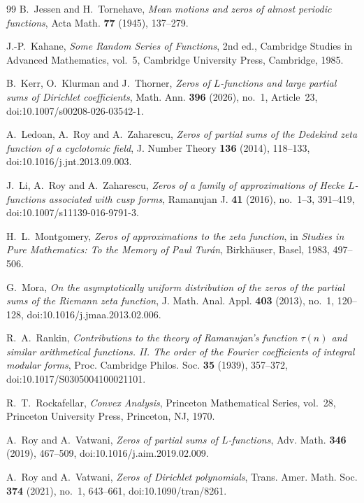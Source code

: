 \documentclass[11pt]{article}
\theoremstyle{definition}
\newcommand{\1}{\mathbf 1}
\begin{document}
\begin{thebibliography}{99}
B.~Jessen and H.~Tornehave,
\textit{Mean motions and zeros of almost periodic functions},
Acta Math. \textbf{77} (1945), 137--279.

J.-P.~Kahane,
\textit{Some Random Series of Functions},
2nd ed., Cambridge Studies in Advanced Mathematics, vol.~5,
Cambridge University Press, Cambridge, 1985.

B.~Kerr, O.~Klurman and J.~Thorner,
\textit{Zeros of $L$-functions and large partial sums of Dirichlet coefficients},
Math. Ann. \textbf{396} (2026), no.~1, Article~23,
doi:10.1007/s00208-026-03542-1.

A.~Ledoan, A.~Roy and A.~Zaharescu,
\textit{Zeros of partial sums of the Dedekind zeta function of a cyclotomic field},
J. Number Theory \textbf{136} (2014), 118--133,
doi:10.1016/j.jnt.2013.09.003.

J.~Li, A.~Roy and A.~Zaharescu,
\textit{Zeros of a family of approximations of Hecke $L$-functions associated with cusp forms},
Ramanujan J. \textbf{41} (2016), no.~1--3, 391--419,
doi:10.1007/s11139-016-9791-3.

H.~L.~Montgomery,
\textit{Zeros of approximations to the zeta function},
in \textit{Studies in Pure Mathematics: To the Memory of Paul Tur\'an},
Birkh\"auser, Basel, 1983, 497--506.

G.~Mora,
\textit{On the asymptotically uniform distribution of the zeros of the partial sums of the Riemann zeta function},
J. Math. Anal. Appl. \textbf{403} (2013), no.~1, 120--128,
doi:10.1016/j.jmaa.2013.02.006.

R.~A.~Rankin,
\textit{Contributions to the theory of Ramanujan's function $\tau(n)$ and similar arithmetical functions. II. The order of the Fourier coefficients of integral modular forms},
Proc. Cambridge Philos. Soc. \textbf{35} (1939), 357--372,
doi:10.1017/S0305004100021101.

R.~T.~Rockafellar,
\textit{Convex Analysis},
Princeton Mathematical Series, vol.~28,
Princeton University Press, Princeton, NJ, 1970.

A.~Roy and A.~Vatwani,
\textit{Zeros of partial sums of $L$-functions},
Adv. Math. \textbf{346} (2019), 467--509,
doi:10.1016/j.aim.2019.02.009.

A.~Roy and A.~Vatwani,
\textit{Zeros of Dirichlet polynomials},
Trans. Amer. Math. Soc. \textbf{374} (2021), no.~1, 643--661,
doi:10.1090/tran/8261.


\end{thebibliography}
\end{document}
